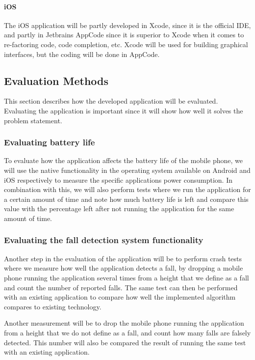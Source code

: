 \documentclass[12pt, a4paper, onecolumn]{article}
\begin{document}
	\paragraph{iOS}
	The iOS application will be partly developed in Xcode, since it is the official IDE, and partly in Jetbrains AppCode since it is superior to Xcode when it comes to re-factoring code, code completion, etc. Xcode will be used for building graphical interfaces, but the coding will be done in AppCode.
	
	\subsection{Evaluation Methods}
	
	This section describes how the developed application will be evaluated. Evaluating the application is important since it will show how well it solves the problem statement.
	
	\subsubsection{Evaluating battery life}
	
	To evaluate how the application affects the battery life of the mobile phone, we will use the native functionality in the operating system available on Android and iOS respectively to measure the specific applications power consumption.
	In combination with this, we will also perform tests where we run the application for a certain amount of time and note how much battery life is left and compare this value with the percentage left after not running the application for the same amount of time.
	
	\subsubsection{Evaluating the fall detection system functionality}
	
	Another step in the evaluation of the application will be to perform crash tests where we measure how well the application detects a fall, by dropping a mobile phone running the application several times from a height that we define as a fall and count the number of reported falls. The same test can then be performed with an existing application to compare how well the implemented algorithm compares to existing technology.
	
	Another measurement will be to drop the mobile phone running the application from a height that we do not define as a fall, and count how many falls are falsely detected. This number will also be compared the result of running the same test with an existing application.
	
\end{document}

